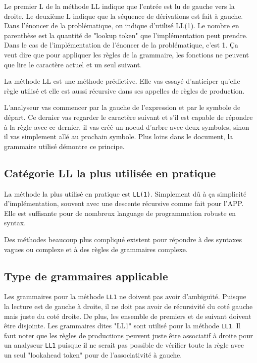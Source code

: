 Le premier L de la méthode LL indique que l'entrée est lu de gauche vers la
droite. Le deuxième L indique que la séquence de dérivations est fait à
gauche. Dans l'énoncer de la problématique, on indique d'utilisé LL(1). Le
nombre en parenthèse est la quantité de "lookup token" que l'implémentation
peut prendre. Dans le cas de l'implémentation de l'énoncer de la problématique,
c'est 1. Ça veut dire que pour appliquer les règles de la grammaire, les
fonctions ne peuvent que lire le caractère actuel et un seul suivant.

La méthode LL est une méthode prédictive. Elle vas essayé d'anticiper qu'elle
règle utilisé et elle est aussi récursive dans ses appelles de règles de
production.

L'analyseur vas commencer par la gauche de l'expression et par le symbole de
départ. Ce dernier vas regarder le caractère suivant et s'il est capable de
répondre à la règle avec ce dernier, il vas créé un noeud d'arbre avec deux
symboles, sinon il vas simplement allé au prochain symbole. Plus loins dans
le document, la grammaire utilisé démontre ce principe.

\subsection{Catégorie LL la plus utilisée en pratique}

La méthode la plus utilisé en pratique est \verb|LL(1)|. Simplement dû à ça
simplicité d'implémentation, souvent avec une descente récursive comme fait
pour l'APP. Elle est suffisante pour de nombreux language de programmation
robuste en syntax.

Des méthodes beaucoup plus compliqué existent pour répondre à des syntaxes
vagues ou complexe et à des règles de grammaires complexe.

\subsection{Type de grammaires applicable}

Les grammaires pour la méthode \verb|LL1| ne doivent pas avoir d’ambiguïté.
Puisque la lecture est de gauche à droite, il ne doit pas avoir de
récursivité du coté gauche mais juste du coté droite. De plus, les ensemble
de premiers et de suivant doivent être disjointe. Les grammaires dites "LL1"
sont utilisé pour la méthode \verb|LL1|. Il faut noter que les règles de
productions peuvent juste être associatif à droite pour un analyseur \verb|LL1|
puisque il ne serait pas possible de vérifier toute la règle avec un seul
"lookahead token" pour de l'associativité à gauche.

